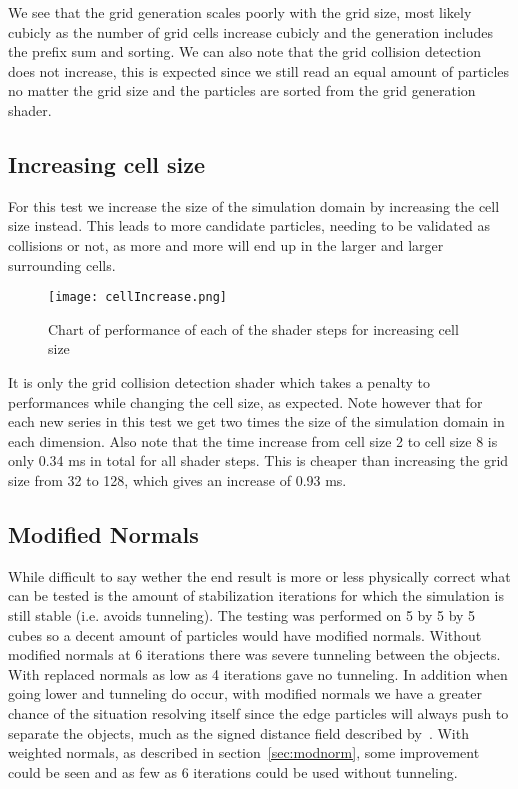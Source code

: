 We see that the grid generation scales poorly with the grid size, most likely cubicly
as the number of grid cells increase cubicly and the generation includes the prefix sum and sorting.
We can also note that the grid collision detection does not increase, this is expected since
we still read an equal amount of particles no matter the grid size and the particles are
sorted from the grid generation shader.

\subsection{Increasing cell size}
For this test we increase the size of the simulation domain by increasing the cell size instead.
This leads to more candidate particles, needing to be validated as collisions or not,
as more and more will end up in
the larger and larger surrounding cells.
\begin{figure}[H]
  \centering
  \texttt{[image: cellIncrease.png]}
  \caption{Chart of performance of each of the shader steps for increasing cell size}
\end{figure}

It is only the grid collision detection shader which takes a penalty to performances
while changing the cell size, as expected. Note however that for each new series
in this test we get two times the size of the simulation domain in each dimension.
Also note that the time increase from cell size 2 to cell size 8 is only 0.34 ms in total for all shader steps.
This is cheaper than increasing the grid size from 32 to 128, which gives an increase of 0.93 ms.

\subsection{Modified Normals}
While difficult to say wether the end result is more or less physically correct
what can be tested is the amount of stabilization iterations for which the simulation
is still stable (i.e. avoids tunneling). The testing was performed on 5 by 5 by 5
cubes so a decent amount of particles would have modified normals. Without modified
normals at 6 iterations there was severe tunneling between the objects. With replaced normals
 as low as 4 iterations gave no tunneling. In addition when going lower
 and tunneling do occur, with modified normals we have a greater chance of the
 situation resolving itself since the edge particles will always push to separate
 the objects, much as the signed distance field described by~\cite{flex}.
 With weighted normals, as described in section~\ref{sec:modnorm}, some improvement
 could be seen and as few as 6 iterations could be used without tunneling.

